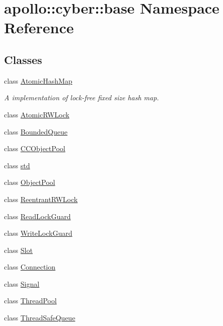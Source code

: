 \hypertarget{namespaceapollo_1_1cyber_1_1base}{\section{apollo\-:\-:cyber\-:\-:base Namespace Reference}
\label{namespaceapollo_1_1cyber_1_1base}
}
\subsection*{Classes}
\begin{DoxyCompactItemize}
\item 
class \hyperlink{classapollo_1_1cyber_1_1base_1_1AtomicHashMap}{Atomic\-Hash\-Map}
\begin{DoxyCompactList}\small\item\em A implementation of lock-\/free fixed size hash map. \end{DoxyCompactList}\item 
class \hyperlink{classapollo_1_1cyber_1_1base_1_1AtomicRWLock}{Atomic\-R\-W\-Lock}
\item 
class \hyperlink{classapollo_1_1cyber_1_1base_1_1BoundedQueue}{Bounded\-Queue}
\item 
class \hyperlink{classapollo_1_1cyber_1_1base_1_1CCObjectPool}{C\-C\-Object\-Pool}
\item 
class \hyperlink{classapollo_1_1cyber_1_1base_1_1std}{std}
\item 
class \hyperlink{classapollo_1_1cyber_1_1base_1_1ObjectPool}{Object\-Pool}
\item 
class \hyperlink{classapollo_1_1cyber_1_1base_1_1ReentrantRWLock}{Reentrant\-R\-W\-Lock}
\item 
class \hyperlink{classapollo_1_1cyber_1_1base_1_1ReadLockGuard}{Read\-Lock\-Guard}
\item 
class \hyperlink{classapollo_1_1cyber_1_1base_1_1WriteLockGuard}{Write\-Lock\-Guard}
\item 
class \hyperlink{classapollo_1_1cyber_1_1base_1_1Slot}{Slot}
\item 
class \hyperlink{classapollo_1_1cyber_1_1base_1_1Connection}{Connection}
\item 
class \hyperlink{classapollo_1_1cyber_1_1base_1_1Signal}{Signal}
\item 
class \hyperlink{classapollo_1_1cyber_1_1base_1_1ThreadPool}{Thread\-Pool}
\item 
class \hyperlink{classapollo_1_1cyber_1_1base_1_1ThreadSafeQueue}{Thread\-Safe\-Queue}
\item 

\end{DoxyCompactItemize}
